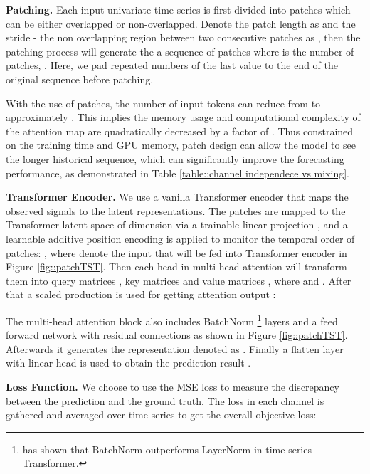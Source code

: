 \documentclass{article} \usepackage{iclr2023_conference,times}
\begin{document}
\textbf{Patching.} Each input univariate time series  is first divided into patches which can be either overlapped or non-overlapped. Denote the patch length as  and the stride - the non overlapping region between two consecutive patches as , then the patching process will generate the a sequence of patches  where  is the number of patches, . Here, we pad  repeated numbers of the last value  to the end of the original sequence before patching. 

With the use of patches, the number of input tokens can reduce from  to approximately . This implies the memory usage and computational complexity of the attention map are quadratically decreased by a factor of . Thus constrained on the training time and GPU memory, patch design can allow the model to see the longer historical sequence, which can significantly improve the forecasting performance, as demonstrated in Table \ref{table::channel independece vs mixing}.

\textbf{Transformer Encoder.} We use a vanilla Transformer encoder that maps the observed signals to the latent representations. The patches are mapped to the Transformer latent space of dimension  via a trainable linear projection , and a learnable additive position encoding  is applied to monitor the temporal order of patches: , where  denote the input that will be fed into Transformer encoder in Figure \ref{fig::patchTST}. Then each head  in multi-head attention will transform them into query matrices , key matrices  and value matrices , where  and . After that a scaled production is used for getting attention output :


The multi-head attention block also includes BatchNorm \footnote{\citet{tst} has shown that BatchNorm outperforms LayerNorm in time series Transformer.} layers and a feed forward network with residual connections as shown in Figure \ref{fig::patchTST}. Afterwards it generates the representation denoted as . Finally a flatten layer with linear head is used to obtain the prediction result .

\iffalse
\textbf{Loss Function.} We choose to use the MSE loss to measure the discrepancy between the prediction and the ground truth. The loss in each channel is  which is gathered and averaged over  time series to get the overall objective loss: 

\fi
\textbf{Loss Function.} We choose to use the MSE loss to measure the discrepancy between the prediction and the ground truth. The loss in each channel is gathered and averaged over  time series to get the overall objective loss: 
\end{document}
